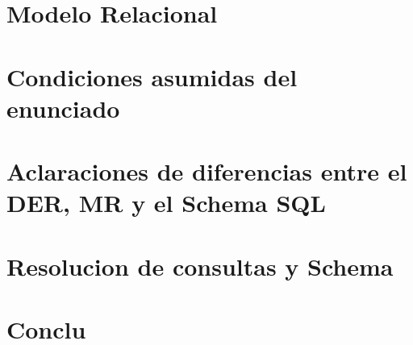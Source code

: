 \documentclass[10pt, a4paper]{article}
\begin{document}
\section{Modelo Relacional}

	

\section{Condiciones asumidas del enunciado}

	

\section{Aclaraciones de diferencias entre el DER, MR y el Schema SQL}

	

\section{Resolucion de consultas y Schema}

	
	
\section{Conclu}

	
\end{document}
